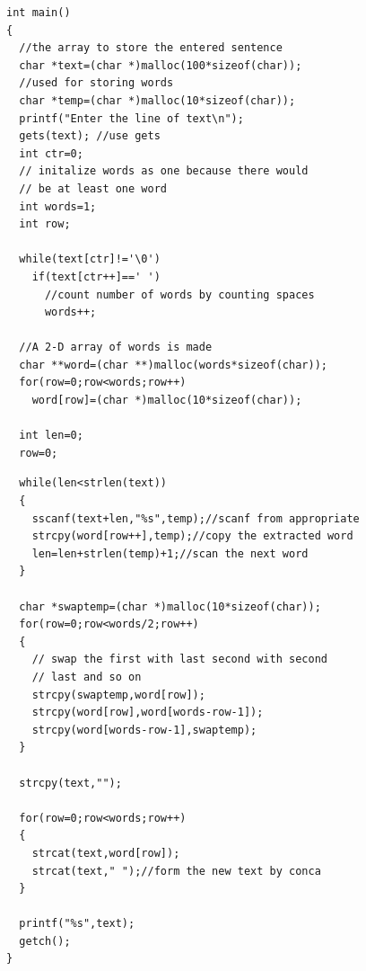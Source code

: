 \documentclass[unknownkeysallowed]{beamer}
\begin{document}

  \begin{frame}[fragile]
  
  \begin{multicols}{2}

  \begin{verbatim}
int main()
{
  //the array to store the entered sentence
  char *text=(char *)malloc(100*sizeof(char));
  //used for storing words
  char *temp=(char *)malloc(10*sizeof(char));
  printf("Enter the line of text\n");
  gets(text); //use gets
  int ctr=0;
  // initalize words as one because there would
  // be at least one word
  int words=1; 
  int row;   
  
  while(text[ctr]!='\0')
    if(text[ctr++]==' ')
      //count number of words by counting spaces
      words++;
  
  //A 2-D array of words is made
  char **word=(char **)malloc(words*sizeof(char));
  for(row=0;row<words;row++)
    word[row]=(char *)malloc(10*sizeof(char));
    
  int len=0;
  row=0;
  \end{verbatim}

\columnbreak  
  
  \begin{verbatim}
  while(len<strlen(text))
  {
    sscanf(text+len,"%s",temp);//scanf from appropriate
    strcpy(word[row++],temp);//copy the extracted word
    len=len+strlen(temp)+1;//scan the next word
  }
  
  char *swaptemp=(char *)malloc(10*sizeof(char));
  for(row=0;row<words/2;row++)
  {
    // swap the first with last second with second 
    // last and so on
    strcpy(swaptemp,word[row]);
    strcpy(word[row],word[words-row-1]);
    strcpy(word[words-row-1],swaptemp);
  }
  
  strcpy(text,"");
  
  for(row=0;row<words;row++)
  {
    strcat(text,word[row]);
    strcat(text," ");//form the new text by conca
  }
  
  printf("%s",text);
  getch();
}
\end{verbatim}  
  
\end{multicols}
\end{frame}

\end{document}
